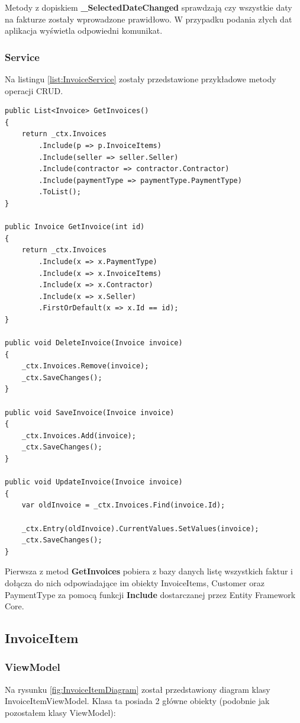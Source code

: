 Metody z dopiskiem \textbf{\_SelectedDateChanged} sprawdzają czy wszystkie daty na fakturze zostały wprowadzone prawidłowo. W przypadku podania złych dat aplikacja wyświetla odpowiedni komunikat. 

\subsubsection{Service}
Na listingu \ref{list:InvoiceService} zostały przedstawione przykładowe metody operacji CRUD. 

\begin{lstlisting}[language={[Sharp]C},label=list:InvoiceService,caption=Przykładowe metody w serwisie InvoiceService, basicstyle=\footnotesize\ttfamily]
public List<Invoice> GetInvoices()
{
    return _ctx.Invoices
        .Include(p => p.InvoiceItems)
        .Include(seller => seller.Seller)
        .Include(contractor => contractor.Contractor)
        .Include(paymentType => paymentType.PaymentType)
        .ToList();
}

public Invoice GetInvoice(int id)
{
    return _ctx.Invoices
        .Include(x => x.PaymentType)
        .Include(x => x.InvoiceItems)
        .Include(x => x.Contractor)
        .Include(x => x.Seller)
        .FirstOrDefault(x => x.Id == id);
}

public void DeleteInvoice(Invoice invoice)
{
    _ctx.Invoices.Remove(invoice);
    _ctx.SaveChanges();
}

public void SaveInvoice(Invoice invoice)
{
    _ctx.Invoices.Add(invoice);
    _ctx.SaveChanges();
}

public void UpdateInvoice(Invoice invoice)
{
    var oldInvoice = _ctx.Invoices.Find(invoice.Id);

    _ctx.Entry(oldInvoice).CurrentValues.SetValues(invoice);
    _ctx.SaveChanges();
}
\end{lstlisting}

Pierwsza z metod \textbf{GetInvoices} pobiera z bazy danych listę wszystkich faktur i dołącza do nich odpowiadające im obiekty InvoiceItems, Customer oraz PaymentType za pomocą funkcji \textbf{Include} dostarczanej przez Entity Framework Core. 

\subsection{InvoiceItem}
\subsubsection{ViewModel}
Na rysunku \ref{fig:InvoiceItemDiagram} został przedstawiony diagram klasy InvoiceItemViewModel. Klasa ta posiada 2 główne obiekty (podobnie jak pozostałem klasy ViewModel):

